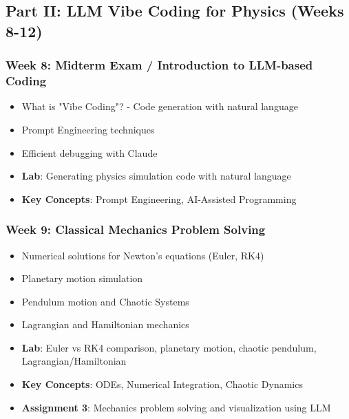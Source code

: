 \documentclass[11pt,a4paper]{article}
\begin{document}
\subsection{Part II: LLM Vibe Coding for Physics (Weeks 8-12)}

\subsubsection*{Week 8: Midterm Exam / Introduction to LLM-based Coding}
\begin{itemize}[noitemsep]
    \item What is "Vibe Coding"? - Code generation with natural language
    \item Prompt Engineering techniques
    \item Efficient debugging with Claude
    \item \textbf{Lab}: Generating physics simulation code with natural language
    \item \textbf{Key Concepts}: Prompt Engineering, AI-Assisted Programming
\end{itemize}

\subsubsection*{Week 9: Classical Mechanics Problem Solving}
\begin{itemize}[noitemsep]
    \item Numerical solutions for Newton's equations (Euler, RK4)
    \item Planetary motion simulation
    \item Pendulum motion and Chaotic Systems
    \item Lagrangian and Hamiltonian mechanics
    \item \textbf{Lab}: Euler vs RK4 comparison, planetary motion, chaotic pendulum, Lagrangian/Hamiltonian
    \item \textbf{Key Concepts}: ODEs, Numerical Integration, Chaotic Dynamics
    \item \textbf{Assignment 3}: Mechanics problem solving and visualization using LLM
\end{itemize}
\end{document}
